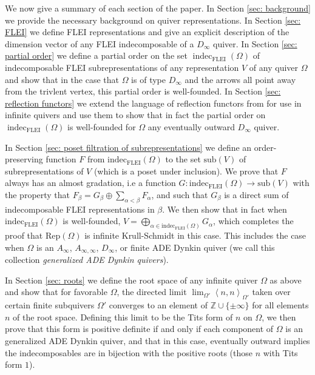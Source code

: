 \documentclass{article}
\newcommand{\bracket}[1]{\left \langle #1 \right\rangle}
\begin{document}
We now give a summary of each section of the paper. In Section \ref{sec: background} we provide the necessary background on quiver representations. In Section \ref{sec: FLEI} we define FLEI representations and give an explicit description of the dimension vector of any FLEI indecomposable of a $D_\infty$ quiver. In Section \ref{sec: partial order} we define a partial order on the set $\operatorname{indec}_{\text{FLEI}}(\Omega)$  of indecomposable FLEI subrepresentations of any representation $V$ of any quiver $\Omega$ and show that in the case that $\Omega$ is of type $D_\infty$ and the arrows all point away from the trivlent vertex, this partial order is well-founded. In Section \ref{sec: reflection functors} we extend  the language of reflection functors from \cite{Bernstein_1973} for use in infinite quivers and use them to show that in fact the partial order on $\operatorname{indec}_{\text{FLEI}}(\Omega)$ is well-founded for $\Omega$ any eventually outward $D_\infty$ quiver. 


In Section \ref{sec: poset filtration of subrepresentations} we define an order-preserving function $F$ from $\text{indec}_{\text{FLEI}}(\Omega)$ to the set $\text{sub}(V)$ of subrepresentations of $V$ (which is a poset under inclusion). We prove that $F$ always has an almost gradation, i.e a function $G: \text{indec}_{\text{FLEI}}(\Omega) \to \text{sub}(V)$ with the property that $F_\beta = G_\beta \oplus \sum_{\alpha < \beta} F_\alpha$, and such that $G_\beta$ is a direct sum of indecomposable FLEI representations in $\beta$. We then show that in fact when $\text{indec}_{\text{FLEI}}(\Omega)$ is well-founded, $V = \bigoplus_{\alpha \in \text{indec}_{\text{FLEI}}(\Omega)} G_\alpha$, which completes the proof that $\text{Rep}(\Omega)$ is infinite Krull-Schmidt in this case. This includes the case when $\Omega$ is an $A_\infty$, $A_{\infty, \infty}$, $D_\infty$, or finite ADE Dynkin quiver (we call this collection \emph{generalized ADE Dynkin quivers}). 

In Section \ref{sec: roots} we define the root space of any infinite quiver $\Omega$ as above and show that for favorable $\Omega$, the directed limit $\lim_{\Omega'} \bracket{n , n}_{\Omega'}$ taken over certain finite subquivers $\Omega'$ converges to an element of $\mathbb{Z} \cup \{ \pm \infty \}$ for all elements $n$ of the root space. Defining this limit to be the Tits form of $n$ on $\Omega$, we then prove that this form is positive definite if and only if each component of $\Omega$ is an  generalized ADE Dynkin quiver, and that in this case, eventually outward implies the indecomposables are in bijection with the positive roots (those $n$ with Tits form $1$). 
\end{document}
